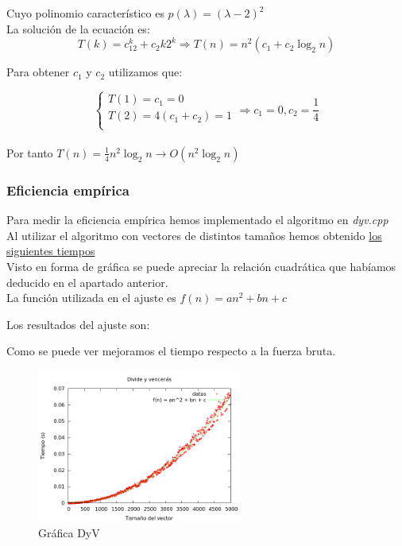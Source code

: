 Cuyo polinomio característico es $p(\lambda) = (\lambda - 2)^2$\\
La solución de la ecuación es:\\
$$T(k)=c_12^k+c_2k2^k \Rightarrow T(n) = n^2(c_1+c_2\log_2n)$$

Para obtener $c_1$ y $c_2$ utilizamos que:

$$\left\lbrace
	\begin{array}{l}
	T(1) = c_1 = 0\\
	T(2) = 4(c_1 + c_2) = 1\\
	\end{array}
	\right. \Rightarrow c_1 = 0, c_2 = \frac{1}{4}$$\\
	
Por tanto $T(n) = \frac{1}{4}n^2\log_2n \longrightarrow O(n^2\log_2n)$
	

\subsubsection{Eficiencia empírica}
Para medir la eficiencia empírica hemos implementado el algoritmo en \textit{dyv.cpp}\\

Al utilizar el algoritmo con vectores de distintos tamaños hemos obtenido \hyperref[tabla_comp]{{\color{blue} los siguientes tiempos}}\\

Visto en forma de gráfica se puede apreciar la relación cuadrática que habíamos deducido en el apartado anterior.\\

La función utilizada en el ajuste es $f(n) = an^2 + bn + c$

Los resultados del ajuste son:\\

\begin{center}
\end{center}

Como se puede ver mejoramos el tiempo respecto a la fuerza bruta.

\begin{figure}[h] 
\centering
	\includegraphics[width=0.6\textwidth]{../Opcional/Graficas/dyv_bruno.png}
	\caption{Gráfica DyV} 
	\label{fig:perros} 
\end{figure}


